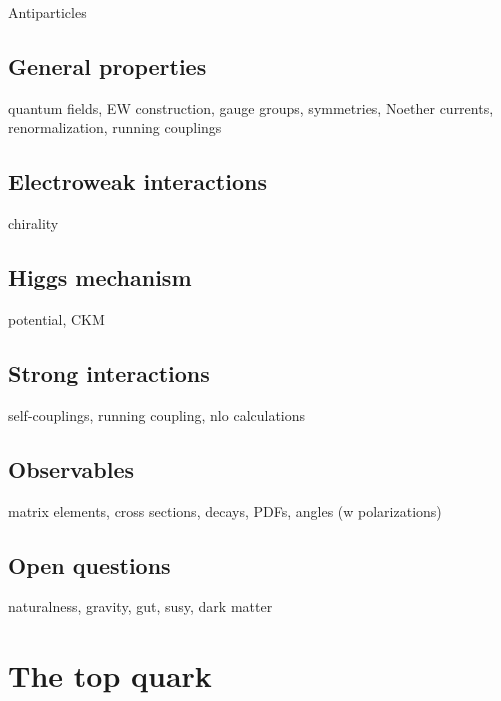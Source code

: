 Antiparticles


\subsection{General properties}
quantum fields, EW construction, gauge groups, symmetries, Noether currents, renormalization, running couplings
\subsection{Electroweak interactions}
\label{sec:theory-ewk}
chirality
\subsection{Higgs mechanism}
potential, CKM
\subsection{Strong interactions}
\label{sec:theory-qcd}
self-couplings, running coupling, nlo calculations
\subsection{Observables}
matrix elements, cross sections, decays, PDFs, angles (w polarizations)
\subsection{Open questions}
naturalness, gravity, gut, susy, dark matter

\section{The top quark}
\subsection{}
